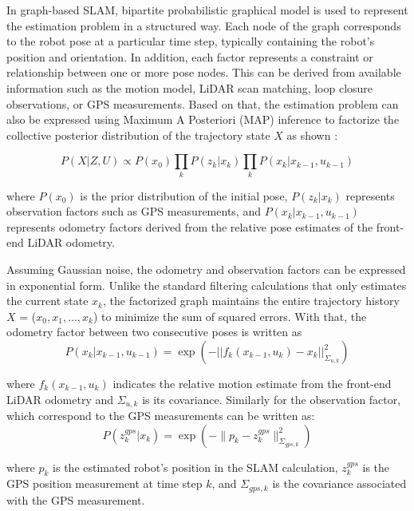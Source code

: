 \documentclass[12pt, a4paper]{article}
\begin{document}
In graph-based SLAM, bipartite probabilistic graphical model is used to represent the estimation problem in a structured way. Each node of the graph corresponds to the robot pose at a particular time step, typically containing the robot’s position and orientation. In addition, each factor represents a constraint or relationship between one or more pose nodes. This can be derived from available information such as the motion model, LiDAR scan matching, loop closure observations, or GPS measurements. Based on that, the estimation problem can also be expressed using Maximum A Posteriori (MAP) inference to factorize the collective posterior distribution of the trajectory state $X$ as shown \cite{wen2021factor}:

\begin{equation} 
    P(X|Z, U) \propto P(x_0) \prod_{k} P(z_k|x_k) \prod_{k} P(x_k|x_{k-1}, u_{k-1}) 
\end{equation}

where $P(x_0)$ is the prior distribution of the initial pose, $P(z_k|x_k)$ represents observation factors such as GPS measurements, and $P(x_k|x_{k-1}, u_{k-1})$ represents odometry factors derived from the relative pose estimates of the front-end LiDAR odometry. 

Assuming Gaussian noise, the odometry and observation factors can be expressed in exponential form. Unlike the standard filtering calculations that only estimates the current state $x_k$, the factorized graph maintains the entire trajectory history $X$ = ($x_0, x_1, \dots, x_k$) to minimize the sum of squared errors. With that, the odometry factor between two consecutive poses is written as
\begin{equation}
    P(x_k|x_{k-1},u_{k-1}) = \exp(-||f_k(x_{k-1}, u_k)-x_k||^2_{\Sigma_{u,k}})
\end{equation}

where $f_k(x_{k-1}, u_k)$ indicates the relative motion estimate from the front-end LiDAR odometry and $\Sigma_{u,k}$ is its covariance. Similarly for the observation factor, which correspond to the GPS measurements can be written as:
\begin{equation}
    P(z_k^{gps}|x_k) = \exp\left(-\|p_k - z_k^{gps}\|^2_{\Sigma_{gps,k}}\right)
\end{equation}

where $p_k$ is the estimated robot's position in the SLAM calculation, $z_k^{gps}$ is the GPS position measurement at time step $k$, and $\Sigma_{gps,k}$ is the covariance associated with the GPS measurement. 
\end{document}
